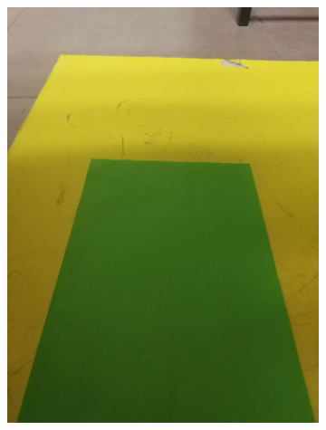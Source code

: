 \documentclass[a4paper,12pt]{article}
\begin{document}
\begin{appendices}
\begin{figure}[H]
\begin{subfigure}{.5\textwidth}
		\includegraphics[width=.98\textwidth]{4}
	\end{subfigure}%
	\begin{subfigure}{.5\textwidth}
		\centering

\end{subfigure}
\end{figure}
\end{appendices}
\end{document}
